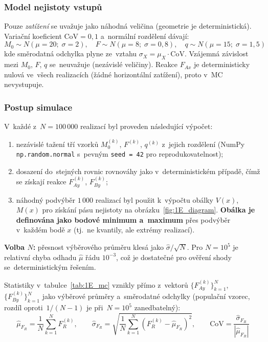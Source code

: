 \documentclass[a4paper,11pt]{article}
\begin{document}
\subsubsection{Model nejistoty vstupů}

Pouze \emph{zatížení} se uvažuje jako náhodná veličina (geometrie je deterministická). Variační koeficient $\mathrm{CoV} = 0{,}1$ a~normální rozdělení dávají:
\begin{equation}
    M_0 \sim N(\mu{=}20;\; \sigma{=}2), \quad
    F   \sim N(\mu{=}8;\;  \sigma{=}0{,}8), \quad
    q   \sim N(\mu{=}15;\; \sigma{=}1{,}5)
\end{equation}
kde směrodatná odchylka plyne ze~vztahu $\sigma_X = \mu_X \cdot \mathrm{CoV}$. Vzájemná závislost mezi $M_0$, $F$, $q$ se~neuvažuje (nezávislé veličiny). Reakce $F_{Ax}$ je deterministicky nulová ve~všech realizacích (žádné horizontální zatížení), proto v~MC nevystupuje.

\subsubsection{Postup simulace}

V~každé z~$N = 100\,000$ realizací byl proveden následující výpočet:
\begin{enumerate}[nosep, label=(\arabic*)]
    \item nezávislé tažení tří vzorků $M_0^{(k)}$, $F^{(k)}$, $q^{(k)}$ z~jejich rozdělení (NumPy \texttt{np.random.normal} s~pevným \texttt{seed = 42} pro reprodukovatelnost);
    \item dosazení do~stejných rovnic rovnováhy jako v~deterministickém případě, čímž se získají reakce $F_{Ay}^{(k)}$, $F_{By}^{(k)}$;
    \item náhodný podvýběr $1\,000$ realizací byl použit k~výpočtu obálky $V(x)$, $M(x)$ pro získání pásu nejistoty na obrázku~\ref{fig:1E_diagram}. \textbf{Obálka je definována jako bodové minimum a~maximum} přes podvýběr v~každém bodě $x$ (tj.~ne kvantily, ale extrémy realizací).
\end{enumerate}

\medskip\noindent
\textbf{Volba $N$:} přesnost výběrového průměru klesá jako $\hat{\sigma}/\sqrt{N}$. Pro $N = 10^5$ je relativní chyba odhadu $\hat{\mu}$ řádu $10^{-3}$, což je dostatečné pro ověření shody se~deterministickým řešením.

\medskip\noindent
Statistiky v~tabulce~\ref{tab:1E_mc} vznikly přímo z~vektorů $\{F_{Ay}^{(k)}\}_{k=1}^{N}$, $\{F_{By}^{(k)}\}_{k=1}^{N}$ jako výběrové průměry a~směrodatné odchylky (populační vzorec, rozdíl oproti~$1/(N-1)$ je při~$N=10^5$ zanedbatelný):
\begin{equation}
    \hat{\mu}_{F_R} = \frac{1}{N}\sum_{k=1}^{N} F_R^{(k)},
    \qquad
    \hat{\sigma}_{F_R} = \sqrt{\frac{1}{N}\sum_{k=1}^{N} \!\left(F_R^{(k)} - \hat{\mu}_{F_R}\right)^{\!2}},
    \qquad
    \widehat{\mathrm{CoV}} = \frac{\hat{\sigma}_{F_R}}{|\hat{\mu}_{F_R}|}
\end{equation}
\end{document}
